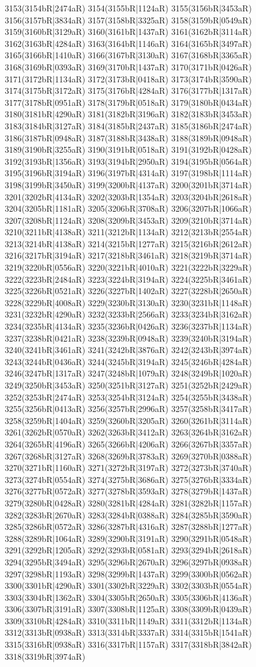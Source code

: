 3153(3154bR|2474aR) 3154(3155bR|1124aR) 3155(3156bR|3453aR) 3156(3157bR|3834aR) 3157(3158bR|3325aR) 3158(3159bR|0549aR) 3159(3160bR|3129aR) 3160(3161bR|1437aR) 3161(3162bR|3114aR) 3162(3163bR|4284aR) 3163(3164bR|1146aR) 3164(3165bR|3497aR) 3165(3166bR|1410aR) 3166(3167bR|3130aR) 3167(3168bR|3365aR) 3168(3169bR|0393aR) 3169(3170bR|1437aR) 3170(3171bR|0426aR) 3171(3172bR|1134aR) 3172(3173bR|0418aR) 3173(3174bR|3590aR) 3174(3175bR|3172aR) 3175(3176bR|4284aR) 3176(3177bR|1317aR) 3177(3178bR|0951aR) 3178(3179bR|0518aR) 3179(3180bR|0434aR) 3180(3181bR|4290aR) 3181(3182bR|3196aR) 3182(3183bR|3453aR) 3183(3184bR|3127aR) 3184(3185bR|2437aR) 3185(3186bR|2474aR) 3186(3187bR|0948aR) 3187(3188bR|3438aR) 3188(3189bR|0948aR) 3189(3190bR|3255aR) 3190(3191bR|0518aR) 3191(3192bR|0428aR) 3192(3193bR|1356aR) 3193(3194bR|2950aR) 3194(3195bR|0564aR) 3195(3196bR|3194aR) 3196(3197bR|4314aR) 3197(3198bR|1114aR) 3198(3199bR|3450aR) 3199(3200bR|4137aR) 3200(3201bR|3714aR) 3201(3202bR|4134aR) 3202(3203bR|1354aR) 3203(3204bR|2618aR) 3204(3205bR|1181aR) 3205(3206bR|3708aR) 3206(3207bR|1066aR) 3207(3208bR|1124aR) 3208(3209bR|3453aR) 3209(3210bR|3714aR) 3210(3211bR|4138aR) 3211(3212bR|1134aR) 3212(3213bR|2554aR) 3213(3214bR|4138aR) 3214(3215bR|1277aR) 3215(3216bR|2612aR) 3216(3217bR|3194aR) 3217(3218bR|3461aR) 3218(3219bR|3714aR) 3219(3220bR|0556aR) 3220(3221bR|4010aR) 3221(3222bR|3229aR) 3222(3223bR|2484aR) 3223(3224bR|3194aR) 3224(3225bR|3461aR) 3225(3226bR|0521aR) 3226(3227bR|1402aR) 3227(3228bR|2650aR) 3228(3229bR|4008aR) 3229(3230bR|3130aR) 3230(3231bR|1148aR) 3231(3232bR|4290aR) 3232(3233bR|2566aR) 3233(3234bR|3162aR) 3234(3235bR|4134aR) 3235(3236bR|0426aR) 3236(3237bR|1134aR) 3237(3238bR|0421aR) 3238(3239bR|0948aR) 3239(3240bR|3194aR) 3240(3241bR|3461aR) 3241(3242bR|3876aR) 3242(3243bR|3974aR) 3243(3244bR|0436aR) 3244(3245bR|3194aR) 3245(3246bR|4284aR) 3246(3247bR|1317aR) 3247(3248bR|1079aR) 3248(3249bR|1020aR) 3249(3250bR|3453aR) 3250(3251bR|3127aR) 3251(3252bR|2429aR) 3252(3253bR|2474aR) 3253(3254bR|3124aR) 3254(3255bR|3438aR) 3255(3256bR|0413aR) 3256(3257bR|2996aR) 3257(3258bR|3417aR) 3258(3259bR|1404aR) 3259(3260bR|3205aR) 3260(3261bR|3114aR) 3261(3262bR|0570aR) 3262(3263bR|3412aR) 3263(3264bR|3162aR) 3264(3265bR|4196aR) 3265(3266bR|4206aR) 3266(3267bR|3357aR) 3267(3268bR|3127aR) 3268(3269bR|3783aR) 3269(3270bR|0388aR) 3270(3271bR|1160aR) 3271(3272bR|3197aR) 3272(3273bR|3740aR) 3273(3274bR|0554aR) 3274(3275bR|3686aR) 3275(3276bR|3334aR) 3276(3277bR|0572aR) 3277(3278bR|3593aR) 3278(3279bR|1437aR) 3279(3280bR|0428aR) 3280(3281bR|4284aR) 3281(3282bR|1157aR) 3282(3283bR|2670aR) 3283(3284bR|0388aR) 3284(3285bR|3590aR) 3285(3286bR|0572aR) 3286(3287bR|4316aR) 3287(3288bR|1277aR) 3288(3289bR|1064aR) 3289(3290bR|3191aR) 3290(3291bR|0548aR) 3291(3292bR|1205aR) 3292(3293bR|0581aR) 3293(3294bR|2618aR) 3294(3295bR|3494aR) 3295(3296bR|2670aR) 3296(3297bR|0938aR) 3297(3298bR|1193aR) 3298(3299bR|1437aR) 3299(3300bR|0562aR) 3300(3301bR|4290aR) 3301(3302bR|3229aR) 3302(3303bR|0554aR) 3303(3304bR|1362aR) 3304(3305bR|2650aR) 3305(3306bR|4136aR) 3306(3307bR|3191aR) 3307(3308bR|1125aR) 3308(3309bR|0439aR) 3309(3310bR|4284aR) 3310(3311bR|1149aR) 3311(3312bR|1134aR) 3312(3313bR|0938aR) 3313(3314bR|3337aR) 3314(3315bR|1541aR) 3315(3316bR|0938aR) 3316(3317bR|1157aR) 3317(3318bR|3842aR) 3318(3319bR|3974aR) 